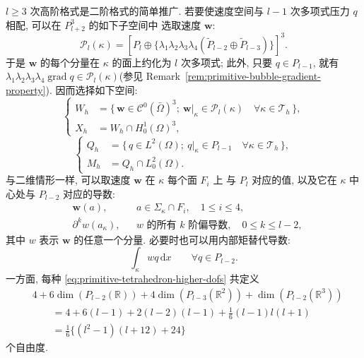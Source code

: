 $l\geq3$ 次高阶格式是二阶格式的简单推广. 若要使速度空间与
$l-1$ 次多项式压力 $q$ 相配, 可以在 $P_{l+2}^3$ 的如下子空间中
选取速度 $\mathbf w$:
\begin{equation}\label{eq:primitive-tetrahedron-higher-local-space}
\mathcal P_l(\kappa)
=\left[P_l\oplus
\{\lambda_1\lambda_2\lambda_3\lambda_4
(\widetilde P_{l-2}\oplus\widetilde P_{l-3})\}\right]^3.
\end{equation}
于是 $\mathbf w$ 的每个分量在 $\kappa$ 的面上约化为 $l$ 次多项式;
此外, 只要 $q\in P_{l-1}$, 就有
$\lambda_1\lambda_2\lambda_3\lambda_4\operatorname{grad}q
\in\mathcal P_l(\kappa)$(参见
Remark~\ref{rem:primitive-bubble-gradient-property}). 因而选择如下空间:
\begin{equation}\label{eq:primitive-tetrahedron-higher-velocity-spaces}
\left\{
\begin{aligned}
W_h&=\{\,\mathbf w\in\mathcal C^0(\bar\Omega)^3;
\ \mathbf w|_\kappa\in\mathcal P_l(\kappa)
\quad\forall\kappa\in\mathcal T_h\,\},\\
X_h&=W_h\cap H_0^1(\Omega)^3,
\end{aligned}
\right.
\end{equation}
\begin{equation}\label{eq:primitive-tetrahedron-higher-pressure-spaces}
\left\{
\begin{aligned}
Q_h&=\{\,q\in L^2(\Omega);
\ q|_\kappa\in P_{l-1}\quad\forall\kappa\in\mathcal T_h\,\},\\
M_h&=Q_h\cap L_0^2(\Omega).
\end{aligned}
\right.
\end{equation}
与二维情形一样, 可以取速度 $\mathbf w$ 在 $\kappa$ 每个面 $F_i$ 上
与 $P_l$ 对应的值, 以及它在 $\kappa$ 中心处与 $P_{l-2}$ 对应的导数:
\begin{subequations}\label{eq:primitive-tetrahedron-higher-dofs}
\begin{align}
&\mathbf w(a),
&&a\in\Sigma_\kappa\cap F_i,\quad1\leq i\leq4,
\label{eq:primitive-tetrahedron-higher-dofs-boundary}\\
&\partial^k w(a_\kappa),
&&\text{$w$ 的所有 $k$ 阶偏导数},\quad0\leq k\leq l-2,
\label{eq:primitive-tetrahedron-higher-dofs-derivatives}
\end{align}
\end{subequations}
其中 $w$ 表示 $\mathbf w$ 的任意一个分量. 必要时也可以用内部矩替代导数:
\begin{equation*}\tag{2.49c}
\label{eq:primitive-tetrahedron-higher-dofs-moments}
\int_\kappa wq\,\mathrm dx
\qquad\forall q\in P_{l-2}.
\end{equation*}
一方面, 每种 \eqref{eq:primitive-tetrahedron-higher-dofs} 共定义
\[
\begin{aligned}
&4+6\dim(P_{l-2}(\mathbb R))
+4\dim(P_{l-3}(\mathbb R^2))
+\dim(P_{l-2}(\mathbb R^3))\\
&\qquad
=4+6(l-1)+2(l-2)(l-1)+\frac16(l-1)l(l+1)\\
&\qquad
=\frac16\{(l^2-1)(l+12)+24\}
\end{aligned}
\]
个自由度.

